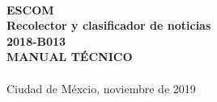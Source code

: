 \begin{center}


\ \\[1cm]

\textbf{ \LARGE{ESCOM}}\\[1cm]

  \textbf{ \LARGE{R}\LARGE{ecolector} \LARGE{y} \LARGE{clasificador} \LARGE{de}  
  \LARGE{noticias}}\\[1cm]
  
  \large{\textbf{2018-B013}}\\[1cm]

  \textbf{ \LARGE{MANUAL TÉCNICO}}\\[1cm]


     \ \\[5cm]
     Ciudad de Méxcio, noviembre de 2019
  

\end{center}